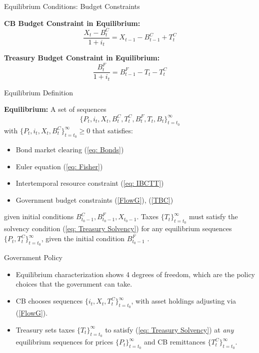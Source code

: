\documentclass[11pt,aspectratio=169]{beamer}
\begin{document}
\begin{frame}{Equilibrium Conditions: Budget Constraints}

\vspace{0.35cm}
\noindent\textbf{CB Budget Constraint in Equilibrium:}
\begin{equation}
\frac{X_{t}-B_{t}^{C}}{1+i_{t}} = X_{t-1} - B_{t-1}^{C} + T_{t}^{C} 
\label{FlowG}
\end{equation}
\vspace{0.5cm}

\noindent\textbf{Treasury Budget Constraint in Equilibrium:}
\begin{equation}
\frac{B_{t}^{F}}{1+i_{t}} = B_{t-1}^{F} - T_{t} - T_{t}^{C}  
\label{TBC}
\end{equation}

\end{frame}

\begin{frame}{Equilibrium Definition}

\textbf{Equilibrium:}  
A set of sequences 
\[
\{ P_t, i_t, X_t, B_t^C, T_t^C, B_t^F, T_t, B_t \}_{t=t_0}^\infty
\]
with $\{ P_t, i_t, X_t, B_t^C \}_{t=t_0}^\infty \geq 0$ that satisfies:
\begin{itemize}
  \item Bond market clearing (\ref{eq: Bonds})
  \item Euler equation (\ref{eq: Fisher})
  \item Intertemporal resource constraint (\ref{eq: IBCTT})
  \item Government budget constraints (\ref{FlowG}), (\ref{TBC})
\end{itemize}

given initial conditions $B_{t_0-1}^C, B_{t_0-1}^F, X_{t_0-1}$.  
Taxes $\{T_t\}_{t=t_0}^\infty$ must satisfy the solvency condition (\ref{eq: Treasury Solvency}) for any equilibrium sequences $\{P_t,T_t^C\}_{t=t_0}^\infty$, given the initial condition $B_{t_0-1}^F$ .
\end{frame}
\begin{frame}{Government Policy}
\begin{itemize}
\item Equilibrium characterization shows 4 degrees of freedom, which are the policy choices that the government can take.
  \vspace{0.3cm}
  \item CB chooses sequences $\{ i_t, X_t, T_t^C \}_{t=t_0}^\infty$, with asset holdings adjusting via (\ref{FlowG}).
\vspace{0.3cm}
\item Treasury sets taxes $\{T_t\}_{t=t_0}^\infty$ to satisfy (\ref{eq: Treasury Solvency}) at \emph{any} equilibrium sequences for prices $\{P_t\}_{t=t_0}^\infty$ and CB remittances $\{T_t^C\}_{t=t_0}^\infty.$
\end{itemize}
\end{frame}
\end{document}
